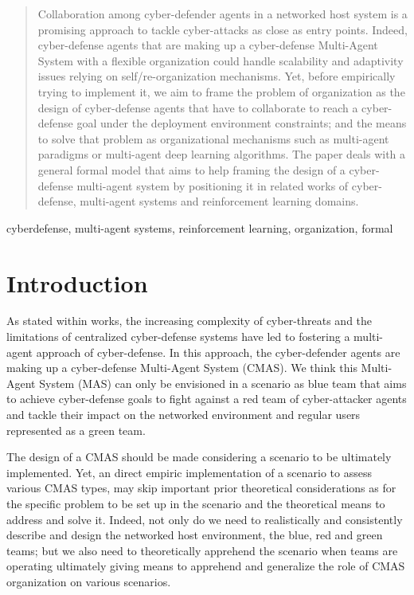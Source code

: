 \documentclass[conference]{IEEEtran}
\begin{document}
\maketitle

\begin{abstract}
 
Collaboration among cyber-defender agents in a networked host system is a promising approach to tackle cyber-attacks as close as entry points. Indeed, cyber-defense agents that are making up a cyber-defense Multi-Agent System with a flexible organization could handle scalability and adaptivity issues relying on self/re-organization mechanisms. Yet, before empirically trying to implement it, we aim to frame the problem of organization as the design of cyber-defense agents that have to collaborate to reach a cyber-defense goal under the deployment environment constraints; and the means to solve that problem as organizational mechanisms such as multi-agent paradigms or multi-agent deep learning algorithms.
The paper deals with a general formal model that aims to help framing the design of a cyber-defense multi-agent system by positioning it in related works of cyber-defense, multi-agent systems and reinforcement learning domains.

\end{abstract}

\begin{IEEEkeywords}
cyberdefense, multi-agent systems, reinforcement learning, organization, formal
\end{IEEEkeywords}

\section{Introduction}

As stated within  works\cite{kott2023autonomous}, the increasing complexity of cyber-threats and the limitations of centralized cyber-defense systems have led to fostering a multi-agent approach of cyber-defense. In this approach, the cyber-defender agents are making up a cyber-defense Multi-Agent System (CMAS). We think this Multi-Agent System (MAS) can only be envisioned in a scenario as blue team that aims to achieve cyber-defense goals to fight against a red team of cyber-attacker agents and tackle their impact on the networked environment and regular users represented as a green team.

The design of a CMAS should be made considering a scenario to be ultimately implemented. Yet, an direct empiric implementation of a scenario to assess various CMAS types, may skip important prior theoretical considerations as for the specific problem to be set up in the scenario and the theoretical means to address and solve it. Indeed, not only do we need to realistically and consistently describe and design the networked host environment, the blue, red and green teams; but we also need to theoretically apprehend the scenario when teams are operating ultimately giving means to apprehend and generalize the role of CMAS organization on various scenarios.
\end{document}
